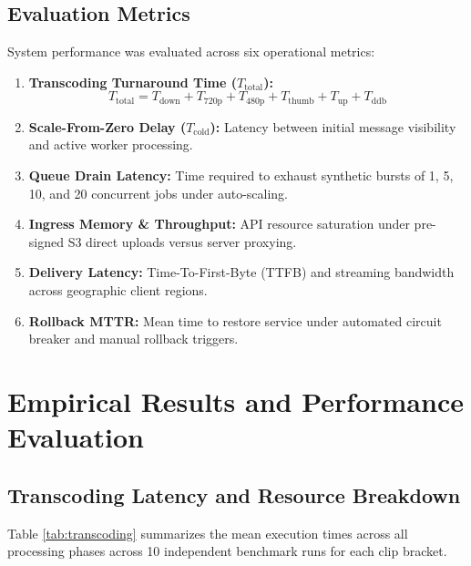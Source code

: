 \documentclass[conference]{IEEEtran}
\begin{document}
\subsection{Evaluation Metrics}
System performance was evaluated across six operational metrics:
\begin{enumerate}
    \item \textbf{Transcoding Turnaround Time ($T_{\text{total}}$):}
    \begin{equation}
        T_{\text{total}} = T_{\text{down}} + T_{\text{720p}} + T_{\text{480p}} + T_{\text{thumb}} + T_{\text{up}} + T_{\text{ddb}}
    \end{equation}
    \item \textbf{Scale-From-Zero Delay ($T_{\text{cold}}$):} Latency between initial message visibility and active worker processing.
    \item \textbf{Queue Drain Latency:} Time required to exhaust synthetic bursts of 1, 5, 10, and 20 concurrent jobs under auto-scaling.
    \item \textbf{Ingress Memory \& Throughput:} API resource saturation under pre-signed S3 direct uploads versus server proxying.
    \item \textbf{Delivery Latency:} Time-To-First-Byte (TTFB) and streaming bandwidth across geographic client regions.
    \item \textbf{Rollback MTTR:} Mean time to restore service under automated circuit breaker and manual rollback triggers.
\end{enumerate}

\section{Empirical Results and Performance Evaluation}

\subsection{Transcoding Latency and Resource Breakdown}
Table \ref{tab:transcoding} summarizes the mean execution times across all processing phases across 10 independent benchmark runs for each clip bracket.
\end{document}
